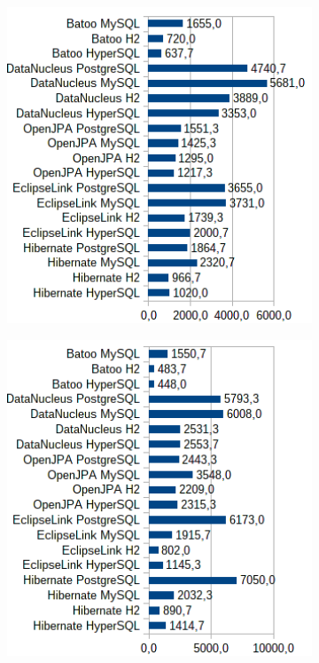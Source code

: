 \begin{figure}[!h]
\begin{subfigure}[b]{1\textwidth}
\includegraphics[width=25em]{obr/bench/jpa5}
\end{subfigure}
\begin{subfigure}[b]{1\textwidth}
\includegraphics[width=25em]{obr/bench/jpa6}
\end{subfigure}
\end{figure}

